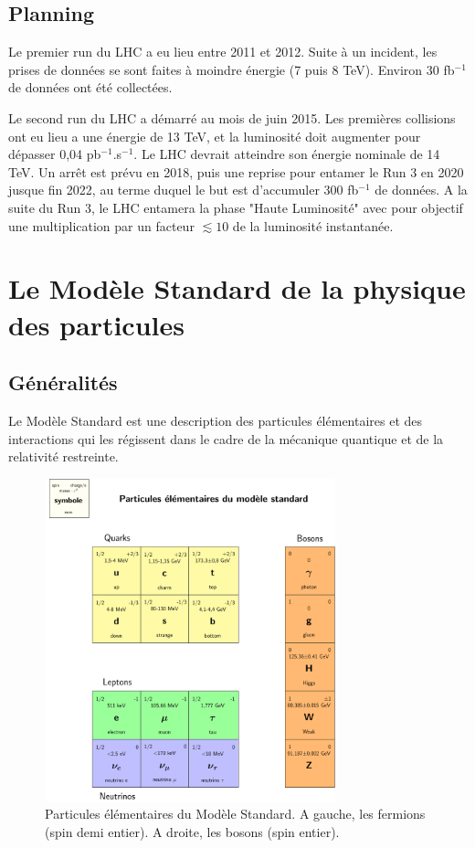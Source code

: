 \documentclass[11pt]{article} %
\begin{document}
\subsection{Planning}

Le premier \og run \fg du LHC a eu lieu entre 2011 et 2012. Suite à un incident, les prises de données se sont faites à moindre énergie (7 puis 8 TeV). Environ 30 fb${}^{ -1}$ de données ont été collectées.

Le second run du LHC a démarré au mois de juin 2015. Les premières collisions ont eu lieu a une énergie de 13 TeV, et la luminosité doit augmenter pour dépasser 0,04 pb${}^{-1}$.s${}^{-1}$. Le LHC devrait atteindre son énergie nominale de 14 TeV. Un arrêt est prévu en 2018, puis une reprise pour entamer le Run 3 en 2020 jusque fin 2022, au terme duquel le but est d'accumuler 300 fb${}^{-1}$ de données. A la suite du Run 3, le LHC entamera la phase "Haute Luminosité" avec pour objectif une multiplication par un facteur $\lesssim 10$ de la luminosité instantanée.

\section{Le Modèle Standard de la physique des particules}

\subsection{Généralités}

Le Modèle Standard est une description des particules élémentaires et des interactions qui les régissent dans le cadre de la mécanique quantique et de la relativité restreinte. 

\begin{figure}[H]
\centering
  \caption{ Particules élémentaires du Modèle Standard. A gauche, les fermions (spin demi entier). A droite, les bosons (spin entier). }
\includegraphics[width=0.75\textwidth]{table_ms.pdf}

\end{figure}
\end{document}
